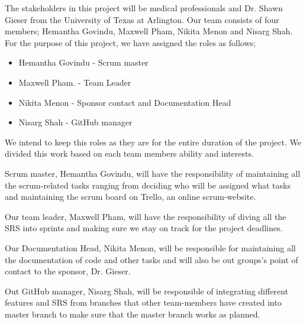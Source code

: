 The stakeholders in this project will be medical professionals and Dr. Shawn Gieser from the University of Texas at Arlington. Our team consists of four members; Hemantha Govindu, Maxwell Pham, Nikita Menon and Nisarg Shah. For the purpose of this project, we have assigned the roles as follows;

\begin{itemize}
  \item Hemantha Govindu - Scrum master
  \item Maxwell Pham.    - Team Leader
  \item Nikita Menon     - Sponsor contact and Documentation Head
  \item Nisarg Shah      - GitHub manager
\end{itemize}


We intend to keep this roles as they are for the entire duration of the project. We divided this work based on each team members ability and interests. 

Scrum master, Hemantha Govindu, will have the responsibility of maintaining all the scrum-related tasks ranging from deciding who will be assigned what tasks and maintaining the scrum board on Trello, an online scrum-website. 

Our team leader, Maxwell Pham, will have the responsibility of diving all the SRS into sprints and making sure we stay on track for the project deadlines.

Our Documentation Head, Nikita Menon, will be responsible for maintaining all the documentation of code and other tasks and will also be out groups's point of contact to the sponsor, Dr. Gieser.

Out GitHub manager, Nisarg Shah, will be responsible of integrating different features and SRS from branches that other team-members have created into master branch to make sure that the master branch works as planned.